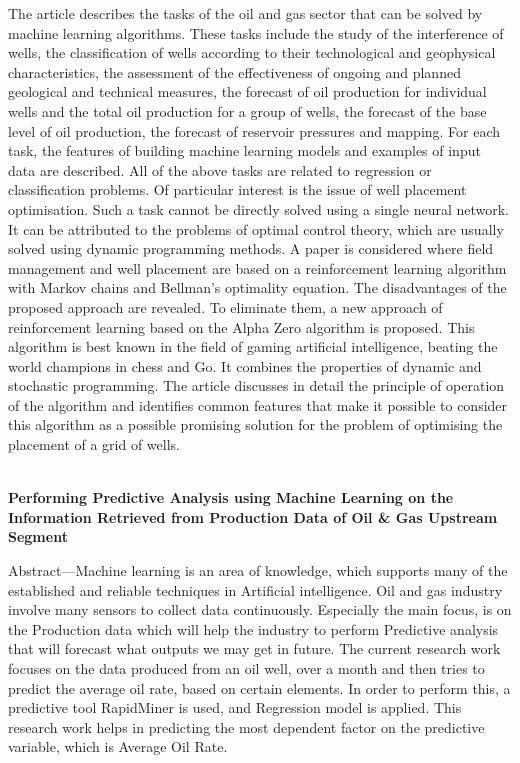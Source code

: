 The article describes the tasks of the oil and gas sector that can be
solved by machine learning algorithms. These tasks include the
study of the interference of wells, the classification of wells
according to their technological and geophysical characteristics, the
assessment of the effectiveness of ongoing and planned geological
and technical measures, the forecast of oil production for individual
wells and the total oil production for a group of wells, the forecast
of the base level of oil production, the forecast of reservoir
pressures and mapping. For each task, the features of building
machine learning models and examples of input data are described.
All of the above tasks are related to regression or classification
problems. Of particular interest is the issue of well placement
optimisation. Such a task cannot be directly solved using a single
neural network. It can be attributed to the problems of optimal
control theory, which are usually solved using dynamic
programming methods. A paper is considered where field
management and well placement are based on a reinforcement
learning algorithm with Markov chains and Bellman's optimality
equation. The disadvantages of the proposed approach are revealed.
To eliminate them, a new approach of reinforcement learning based
on the Alpha Zero algorithm is proposed. This algorithm is best
known in the field of gaming artificial intelligence, beating the
world champions in chess and Go. It combines the properties of
dynamic and stochastic programming. The article discusses in detail
the principle of operation of the algorithm and identifies common
features that make it possible to consider this algorithm as a
possible promising solution for the problem of optimising the
placement of a grid of wells. 

\\

\textbf{Performing Predictive Analysis using Machine Learning on the Information Retrieved from Production Data of Oil & Gas Upstream Segment}

Abstract—Machine learning is an area of knowledge, which
supports many of the established and reliable techniques in
Artificial intelligence. Oil and gas industry involve many sensors
to collect data continuously. Especially the main focus, is on the
Production data which will help the industry to perform
Predictive analysis that will forecast what outputs we may get in
future. The current research work focuses on the data produced
from an oil well, over a month and then tries to predict the
average oil rate, based on certain elements. In order to perform
this, a predictive tool RapidMiner is used, and Regression model
is applied. This research work helps in predicting the most
dependent factor on the predictive variable, which is Average Oil
Rate. 

